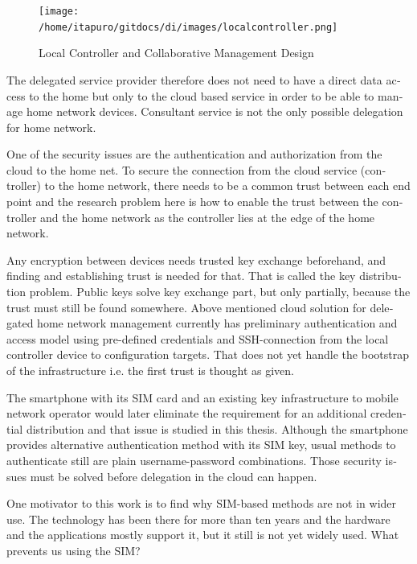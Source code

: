 \documentclass[12pt,a4paper,english]{tutthesis}
\begin{document}
\begin{otherlanguage}{english}
\begin{figure}[htb]
\centering
\texttt{[image: /home/itapuro/gitdocs/di/images/localcontroller.png]}
\caption{\label{fig:localcontroller}Local Controller and Collaborative Management Design}
\end{figure}


The delegated service provider therefore does not need to have a direct data
access to the home but only to the cloud based service in order to be able to
manage home network devices.
Consultant service is not the only possible delegation for home network.








One of the security issues are the authentication and authorization 
from the cloud to the home net.
To secure the connection from the cloud service (controller)
to the home network, there needs to be a common trust between each end
point and the research problem here is how to enable the trust between the
controller and the home network as the controller lies at the edge of the
home network.


Any encryption between devices needs trusted key exchange beforehand,
and finding and establishing trust is needed for that.  That is called
the key distribution problem. Public keys solve key exchange part, but
only partially, because the trust must still be found somewhere.
Above mentioned cloud solution for delegated home network
management currently has preliminary authentication and access model
using pre-defined credentials and SSH-connection from the local
controller device to configuration
targets\cite[Chap.4]{silverajan2015collaborative}.
That does not yet handle the bootstrap of the infrastructure
i.e. the first trust is thought as given. 

The smartphone with its SIM card and an existing key infrastructure to mobile
network operator would later eliminate the requirement for an
additional credential distribution and that issue is studied in this
thesis.  Although the smartphone provides alternative authentication
method with its SIM key, usual methods to authenticate still are plain
username-password combinations.  Those security issues must be solved
before delegation in the cloud can happen.




One motivator to this work is to find why SIM-based methods are not in
wider use.  The technology has been there for more than ten years and
the hardware and the applications mostly support it, but it still is
not yet widely used. What prevents us using the SIM?



\end{otherlanguage}
\end{document}
